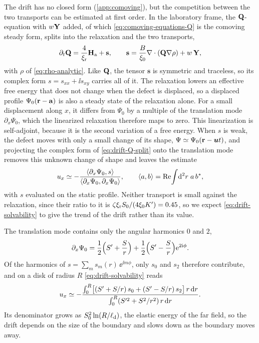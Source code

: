 \documentclass[aps,pre,reprint,superscriptaddress,longbibliography,nofootinbib
]{revtex4-2}
\begin{document}
The drift has no closed form (\cref{app:comoving}), but the
competition between the two transports can be estimated at
first order. In the laboratory frame, the $\mathbf{Q}$-equation
with $w\mathbf{Y}$ added, of which \cref{eq:comoving-equations-Q}
is the comoving steady form, splits into the relaxation and
the two transports,
\begin{equation}
  \label{eq:drift-Q-split}
  \partial_t\mathbf{Q}=\frac4{\xi_{\rm r}}\mathbf{H}_\text{a}+\mathbf{s},
  \qquad
  \mathbf{s}=\frac B{\xi_0}\nabla\cdot(\mathbf{Q}\nabla\rho)+w\,\mathbf{Y},
\end{equation}
with $\rho$ of \cref{eq:rho-analytic}. Like $\mathbf{Q}$, the
tensor $\mathbf{s}$ is symmetric and traceless, so its
complex form $s=s_{xx}+\ii s_{xy}$ carries all of it. The
relaxation lowers an effective free energy that does not
change when the defect is displaced, so a displaced profile
$\Psi_0(\mathbf{r}-\mathbf{a})$ is also a steady state of the
relaxation alone. For a small displacement along $x$, it
differs from $\Psi_0$ by a multiple of the translation mode
$\partial_x\Psi_0$, which the linearized relaxation
therefore maps to zero. This linearization is self-adjoint,
because it is the second variation of a free energy. When
$s$ is weak, the defect moves with only a small change of
its shape, $\Psi\simeq\Psi_0(\mathbf{r}-\boldsymbol{u} t)$, and projecting the
complex form of \cref{eq:drift-Q-split} onto the
translation mode removes this unknown change of shape and
leaves the estimate
\begin{equation}
  \label{eq:drift-solvability}
  u_x\simeq-\frac{\left\langle\partial_x\Psi_0,s\right\rangle}{\left\langle\partial_x\Psi_0,\partial_x\Psi_0\right\rangle},
  \qquad
  \left\langle a,b\right\rangle=\mathrm{Re}\!\int\!\mathrm{d}^2r\;a\,b^*,
\end{equation}
with $s$ evaluated on the static profile. Neither transport
is small against the relaxation, since their ratio to it is
$\zeta\xi_{\rm r} S_0/(4\xi_0K')=0.45$, so we expect
\cref{eq:drift-solvability} to give the trend of the drift
rather than its value.

The translation mode contains only the angular harmonics
$0$ and $2$,
\begin{equation}
  \label{eq:drift-translation}
  \partial_x\Psi_0=\frac12\Bigl(S'+\frac Sr\Bigr)+\frac12\Bigl(S'-\frac Sr\Bigr)\mathrm{e}^{2\mathrm{i}\phi}.
\end{equation}
Of the harmonics of $s=\sum_ms_m(r)\,\ee^{\ii m\phi}$, only
$s_0$ and $s_2$ therefore contribute, and on a disk of
radius $R$ \cref{eq:drift-solvability} reads
\begin{equation}
  \label{eq:drift-radial}
  u_x\simeq-\frac{\int_0^R\bigl[(S'+S/r)\,s_0+(S'-S/r)\,s_2\bigr]\,r\,\mathrm{d} r}
  {\int_0^R(S'^2+S^2/r^2)\,r\,\mathrm{d} r}.
\end{equation}
Its denominator grows as $S_0^2\ln(R/\ell_{\rm d})$, the elastic
energy of the far field, so the drift depends on the size
of the boundary and slows down as the boundary moves away.
\end{document}

